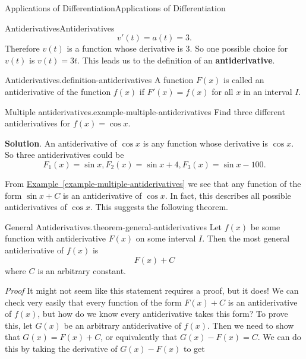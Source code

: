 \documentclass[10pt,]{book}
\makeatletter
\newcommand{\terminology}[1]{\textbf{#1}}
\renewcommand*{\proofname}{Proof}
\renewenvironment{proof}[1][\proofname]{\par
  \pushQED{\qed}%
  \normalfont \topsep6\p@\@plus6\p@\relax
  \trivlist
  \item\relax
    {\itshape
    #1\@addpunct{.}}\hspace\labelsep\ignorespaces
}{%
  \popQED\endtrivlist\@endpefalse
}
\numberwithin{equation}{section}
\makeatother
\begin{document}
\begin{chapterptx}{Applications of Differentiation}{}{Applications of Differentiation}{}{}
\begin{sectionptx}{Antiderivatives}{}{Antiderivatives}{}{}
\begin{equation*}
v'(t) = a(t) = 3.
\end{equation*}
Therefore \(v(t)\) is a function whose derivative is \(3\). So one possible choice for \(v(t)\) is \(v(t) = 3t\). This leads us to the definition of an \terminology{antiderivative}.%
\begin{definition}{Antiderivatives.}{definition-antiderivatives}%
\hypertarget{p-378}{}%
A function \(F(x)\) is called an antiderivative of the function \(f(x)\) if \(F'(x) = f(x)\) for all \(x\) in an interval \(I\).%
\end{definition}
\begin{example}{Multiple antiderivatives.}{example-multiple-antiderivatives}%
\hypertarget{p-379}{}%
Find three different antiderivatives for \(f(x) = \cos x\).%
\par\smallskip%
\noindent\textbf{Solution}.\hypertarget{solution-84}{}\quad%
\hypertarget{p-380}{}%
An antiderivative of \(\cos x\) is any function whose derivative is \(\cos x\). So three antiderivatives could be%
\begin{equation*}
F_{1}(x) = \sin x, F_{2}(x) = \sin x + 4, F_{3}(x) = \sin x - 100.
\end{equation*}
%
\end{example}
\hypertarget{p-381}{}%
From \hyperref[example-multiple-antiderivatives]{Example~\ref{example-multiple-antiderivatives}} we see that any function of the form \(\sin x +C\) is an antiderivative of \(\cos x\). In fact, this describes all possible antiderivatives of \(\cos x\). This suggests the following theorem.%
\begin{theorem}{General Antiderivatives.}{}{theorem-general-antiderivatives}%
\hypertarget{p-382}{}%
Let \(f(x)\) be some function with antiderivative \(F(x)\) on some interval \(I\). Then the most general antiderivative of \(f(x)\) is%
\begin{equation*}
F(x) + C
\end{equation*}
where \(C\) is an arbitrary constant.%
\end{theorem}
\begin{proof}\hypertarget{proof-9}{}
\hypertarget{p-383}{}%
It might not seem like this statement requires a proof, but it does! We can check very easily that every function of the form \(F(x)+C\) is an antiderivative of \(f(x)\), but how do we know every antiderivative takes this form? To prove this, let \(G(x)\) be an arbitrary antiderivative of \(f(x)\). Then we need to show that \(G(x) = F(x) + C\), or equivalently that \(G(x) - F(x) = C\). We can do this by taking the derivative of \(G(x) - F(x)\) to get%

\end{proof}
\end{sectionptx}
\end{chapterptx}
\end{document}

